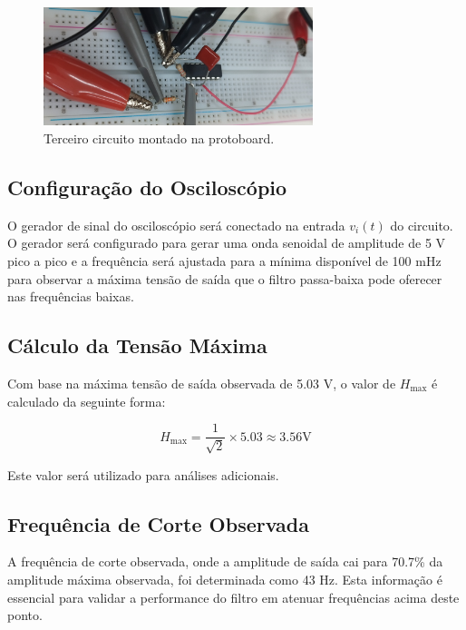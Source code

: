 \documentclass[
	12pt,				%
	openright,			%
	twoside,			%
	a4paper,			%
	english,			%
	french,				%
	spanish,			%
	brazil,				%
	]{abntex2}
\begin{document}
\begin{figure}[H]
    \centering
    \includegraphics[width=0.7\textwidth]{imgs/protoboard_circuit3.jpg}
    \caption{Terceiro circuito montado na protoboard.}
    \label{fig:protoboard_circuit3}
\end{figure}

\subsection{Configuração do Osciloscópio}

O gerador de sinal do osciloscópio será conectado na entrada \( v_i(t) \) do circuito. O gerador será configurado para gerar uma onda senoidal de amplitude de 5 V pico a pico e a frequência será ajustada para a mínima disponível de 100 mHz para observar a máxima tensão de saída que o filtro passa-baixa pode oferecer nas frequências baixas.



\subsection{Cálculo da Tensão Máxima}

Com base na máxima tensão de saída observada de 5.03 V, o valor de \( H_{\text{max}} \) é calculado da seguinte forma:

\begin{equation}
H_{\text{max}} = \frac{1}{\sqrt{2}} \times 5.03 \approx 3.56 \text{V}
\end{equation}

Este valor será utilizado para análises adicionais.

\subsection{Frequência de Corte Observada}
A frequência de corte observada, onde a amplitude de saída cai para 70.7\% da amplitude máxima observada, foi determinada como 43 Hz. Esta informação é essencial para validar a performance do filtro em atenuar frequências acima deste ponto.
\end{document}
